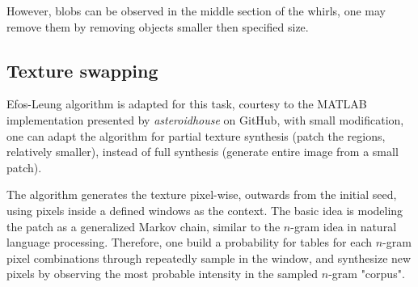 \documentclass[12pt]{article}
\begin{document}
However, blobs can be observed in the middle section of the whirls, one may remove them by removing objects smaller then specified size.

\subsection*{Texture swapping}
Efos-Leung algorithm is adapted for this task, courtesy to the MATLAB implementation presented by {\it asteroidhouse} on GitHub, with small modification, one can adapt the algorithm for partial texture synthesis (patch the regions, relatively smaller), instead of full synthesis (generate entire image from a small patch). 

The algorithm generates the texture pixel-wise, outwards from the initial seed, using pixels inside a defined windows as the context. 
The basic idea is modeling the patch as a generalized Markov chain, similar to the $n$-gram idea in natural language processing. 
Therefore, one build a probability for tables for each $n$-gram pixel combinations through repeatedly sample in the window, and synthesize new pixels by observing the most probable intensity in the sampled $n$-gram "corpus".
\end{document}
